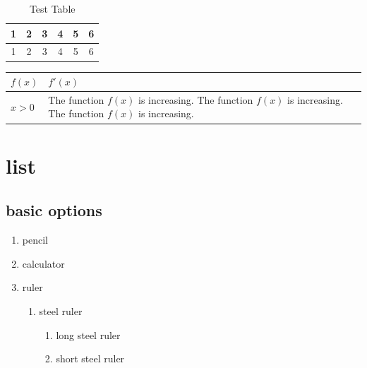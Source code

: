 \documentclass[12pt,a4paper]{article}
\begin{document}
\vspace{1cm} %

\begin{table}[H] %
	\centering %
	\def\arraystrech{1.5} %
	\begin{tabular}{|cccccc|}
		\hline 
		1 &2 &3 &4 &5 &6\\ \hline 
		1 &2 &3 &4 &5 &6\\ \hline
	\end{tabular}
	\caption{Test Table} %
\end{table}
\vspace{1cm}
\begin{table}[H]
	\centering
	\begin{tabular}{|l|p{5cm}|} %
		\hline
		$f(x)$ & $f'(x)$ \\ \hline
		$x > 0$ & The function $f(x)$ is increasing. The function $f(x)$ is increasing. The function $f(x)$ is increasing.\\
		\hline
	\end{tabular}
\end{table}
\pagebreak

\section{list}
\subsection{basic options}
\begin{enumerate}
	\item pencil
	\item calculator
	\item ruler
	\begin{enumerate}
		\item steel ruler
		\begin{enumerate}
			\item long steel ruler
			\item short steel ruler
		\end{enumerate}
	\end{enumerate}
\end{enumerate}
\end{document}
